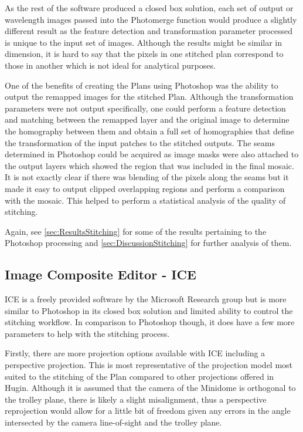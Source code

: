 As the rest of the software produced a closed box solution, each set of output or wavelength images passed into the Photomerge function would produce a slightly different result as the feature detection and transformation parameter processed is unique to the input set of images. Although the results might be similar in dimension, it is hard to say that the pixels in one stitched plan correspond to those in another which is not ideal for analytical purposes. 

One of the benefits of creating the Plans using Photoshop was the ability to output the remapped images for the stitched Plan. Although the transformation parameters were not output specifically, one could perform a feature detection and matching between the remapped layer and the original image to determine the homography between them and obtain a full set of homographies that define the transformation of the input patches to the stitched outputs. The seams determined in Photoshop could be acquired as image masks were also attached to the output layers which showed the region that was included in the final mosaic. It is not exactly clear if there was blending of the pixels along the seams but it made it easy to output clipped overlapping regions and perform a comparison with the mosaic. This helped to perform a statistical analysis of the quality of stitching. 

Again, see \cref{sec:ResultsStitching} for some of the results pertaining to the Photoshop processing and \cref{sec:DiscussionStitching} for further analysis of them.

\subsection{Image Composite Editor - ICE}
\label{sec:Ice}
ICE is a freely provided software by the Microsoft Research group but is more similar to Photoshop in its closed box solution and limited ability to control the stitching workflow. In comparison to Photoshop though, it does have a few more parameters to help with the stitching process.

Firstly, there are more projection options available with ICE including a perspective projection. This is most representative of the projection model most suited to the stitching of the Plan compared to other projections offered in Hugin. Although it is assumed that the camera of the Minidome is orthogonal to the trolley plane, there is likely a slight misalignment, thus a perspective reprojection would allow for a little bit of freedom given any errors in the angle intersected by the camera line-of-sight and the trolley plane.


